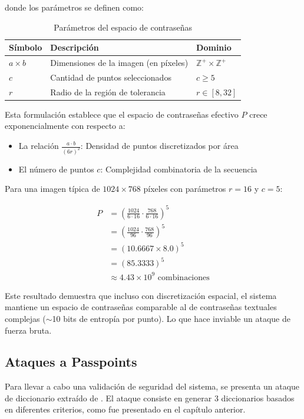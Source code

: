 donde los parámetros se definen como:

\begin{table}[ht]
	\centering
	\caption{Parámetros del espacio de contraseñas}
	\label{tab:parametros-espacio}
	\begin{tabularx}{0.9\textwidth}{lXl}
		\toprule
		\textbf{Símbolo} & \textbf{Descripción} & \textbf{Dominio} \\
		\midrule
		$a \times b$ & Dimensiones de la imagen (en píxeles) & $\mathbb{Z}^+ \times \mathbb{Z}^+$ \\
		$c$ & Cantidad de puntos seleccionados & $c \geq 5$ \\
		$r$ & Radio de la región de tolerancia & $r \in [8, 32]$ \\
		\bottomrule
	\end{tabularx}
\end{table}

\vspace{0.5cm}

Esta formulación establece que el espacio de contraseñas efectivo $P$ crece exponencialmente con respecto a:
\begin{itemize}
	\item La relación $\frac{a \cdot b}{(6r)^2}$: Densidad de puntos discretizados por área
	\item El número de puntos $c$: Complejidad combinatoria de la secuencia
\end{itemize}

Para una imagen típica de $1024 \times 768$ píxeles con parámetros $r = 16$ y $c = 5$:

\begin{align*}
	P &= \left( \frac{1024}{6 \cdot 16} \cdot \frac{768}{6 \cdot 16} \right)^5 \\
	&= \left( \frac{1024}{96} \cdot \frac{768}{96} \right)^5 \\
	&= (10.6667 \times 8.0)^5 \\
	&= (85.3333)^5 \\
	&\approx 4.43 \times 10^9 \text{ combinaciones}
\end{align*}

Este resultado demuestra que incluso con discretización espacial, el sistema mantiene un espacio de contraseñas comparable al de contraseñas textuales complejas ($\sim$10 bits de entropía por punto). Lo que hace inviable un ataque de fuerza bruta.


\subsection{Ataques a Passpoints}
Para llevar a cabo una validaci\'on de seguridad del sistema, se presenta un ataque de diccionario extra\'ido de \cite{van2010purely}. El ataque consiste en generar 3 diccionarios basados en diferentes criterios, como fue presentado en el cap\'itulo anterior.

